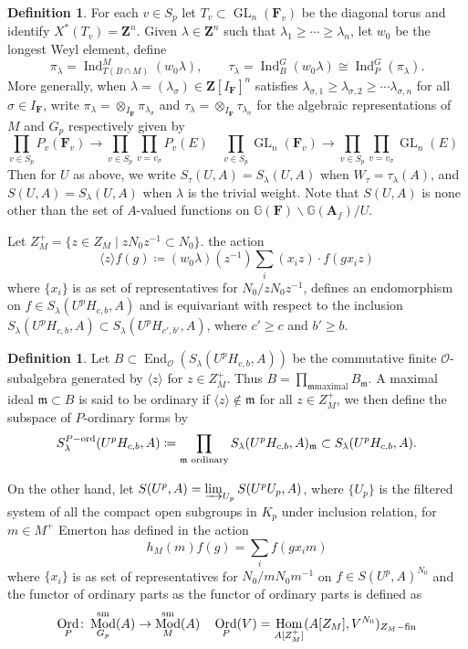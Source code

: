 \documentclass[leqno]{amsart}
\DeclareMathOperator{\Mod}{\textnormal{Mod}}
\DeclareMathOperator{\Ord}{Ord}
\newcommand{\sm}{\textnormal{sm}}
\newcommand{\fin}{\textnormal{fin}}
\newcommand{\ord}{\textnormal{ord}}
\newcommand{\GG}{\mathbb G}
\DeclareMathOperator{\GL}{GL}
\newcommand{\Z}{{\mathbf{Z}}}
\newcommand{\A}{\mathbf A}
\newcommand{\F}{{\mathbf{F}}} %
\newcommand{\oo}{\mathcal O}
\newcommand{\1}{\mathbf{1}}
\newcommand{\fm}{\mathfrak m}
\DeclareMathOperator{\End}{End}
\DeclareMathOperator{\Hom}{Hom}
\DeclareMathOperator{\Ind}{Ind}
\theoremstyle{definition}
\newtheorem{defn}[thm]{Definition}
\theoremstyle{remark}
\begin{document}
\begin{defn}
	For each $v\in S_p$
	let $T_v\subset \GL_n(\F_v)$
	be the diagonal torus and 
	identify  $X^*(T_v)=\Z^n$.
	Given $\lambda\in \Z^n$
	such that $\lambda_1\geq \cdots\geq \lambda_n$,
	let  $w_0$ be the longest Weyl element, define
	\begin{equation}
	\pi_\lambda=\Ind_{T(B\cap M)}^M(w_0\lambda),\qquad
	\tau_\lambda=\Ind_B^G(w_0\lambda)\cong 
	\Ind_P^G(\pi_\lambda).
	\end{equation}
	More generally,
	when $\lambda=(\lambda_{\sigma})\in \Z[I_\F]^n$
	satisfies 
	$\lambda_{\sigma,1}\geq \lambda_{\sigma,2}\geq \cdots\lambda_{\sigma,n}$
	for all $\sigma\in I_\F$, 
	write 
	$\pi_\lambda=\otimes_{I_\F}\pi_{\lambda_{\sigma}}$ and 
	$\tau_\lambda=\otimes_{I_\F}\tau_{\lambda_{\sigma}}$
	for the algebraic representations of $M$ and  $G_p$
	respectively given by 
	\[
	\prod_{v\in S_p}P_v(\F_v)\to 	
	\prod_{v\in S_p}\prod_{v=v_\sigma}P_v(E)\quad
	\prod_{v\in S_p}\GL_n(\F_v)\to 	
	\prod_{v\in S_p}\prod_{v=v_\sigma}\GL_n(E)\quad
	\]
	Then for $U$ as above, we write 
	$S_{\tau}(U,A)=S_{\lambda}(U,A)$ when $W_\tau=\tau_\lambda(A)$, and
	$S(U,A)=S_{\lambda}(U,A)$ when $\lambda$ is the trivial weight.
	Note that $S(U,A)$ is none other than the set of 
	$A$-valued functions on  $\GG(\F)\backslash \GG(\A_f)/U$.
\end{defn}


Let $Z_M^+=\{z\in Z_M\mid zN_0z^{-1}\subset N_0\}$.
the action
\[
	\langle z\rangle f(g)\coloneqq
	(w_0\lambda)(z^{-1})\sum_i (x_iz)\cdot f(gx_iz)
\]
where $\{x_i\}$ is 
as set of representatives for $N_0/zN_0z^{-1}$,
defines an endomorphism on $f\in S_\lambda(U^pH_{c,b},A)$
and is equivariant with respect to the inclusion
$S_\lambda(U^pH_{c,b},A)\subset S_\lambda(U^pH_{c',b'},A)$,
where  $c'\geq c$ and  $b'\geq b$.
\begin{defn}
Let $B\subset \End_\oo(S_\lambda(U^pH_{c,b},A))$ 
be the commutative finite $\oo$-subalgebra generated by 
$ \langle z\rangle$ for $z\in Z_M^+$.
Thus $B=\prod_{\fm \text{maximal}}B_\fm$.
A maximal ideal $\fm\subset B$ is said to be ordinary
if $ \langle z\rangle\notin \fm$ for all $z\in Z_M^+$, we then define 
the subspace of $P$-ordinary forms by
\[
	S_\lambda^{P-\ord}(U^pH_{c,b},A)\coloneqq\prod_{\fm \text{ ordinary}}
	S_\lambda(U^pH_{c,b},A)_{\fm}\subset
	S_\lambda(U^pH_{c,b},A).
\]
\end{defn}

On the other hand, 
let $S(U^p,A)=\varinjlim_{U_p}S(U^pU_p,A)$,
where $\{U_p\}$ is the filtered system of 
all the compact open subgroups in $K_p$ under inclusion relation,
for $m\in M^+$ Emerton has defined in \cite{emeI} the action
\[
	h_M(m)f(g)=\sum_i f(gx_im)
\]
where $\{x_i\}$ is 
as set of representatives for $N_0/mN_0m^{-1}$
on $f\in S(U^p,A)^{N_0}$ 
and the functor of ordinary parts as
the functor of ordinary parts is defined as
\[
	\Ord_P\colon
	\Mod^{\sm}_{G_p}(A)\to \Mod^{\sm}_M(A)\quad
	\Ord_P(V)=\Hom_{A[Z_M^+]}(A[Z_M], V^{N_0})_{Z_M-\fin}
\]
\end{document}
